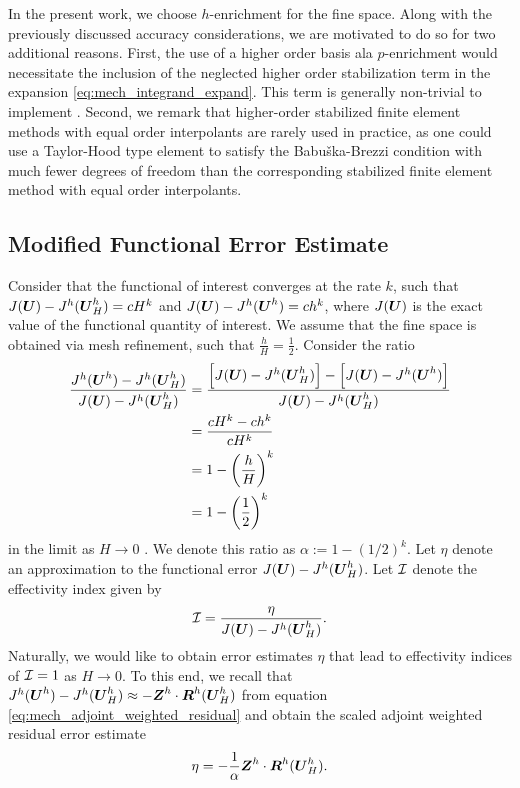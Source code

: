 In the present work, we choose $h$-enrichment for the fine space.
Along with the previously discussed accuracy considerations, we are motivated
to do so for two additional reasons. First, the use of a higher order basis
ala $p$-enrichment would necessitate the inclusion of the neglected higher
order stabilization term in the expansion \eqref{eq:mech_integrand_expand}.
This term is generally non-trivial to implement \cite{maniatty2002higher}.
Second, we remark that higher-order stabilized finite element methods with
equal order interpolants are rarely used in practice, as one could use a
Taylor-Hood type element \cite{taylor1973numerical} to satisfy the
Babu\v{s}ka-Brezzi condition with much fewer degrees of freedom than the
corresponding stabilized finite element method with equal order interpolants.

\subsection{Modified Functional Error Estimate}

Consider that the functional of interest converges at the rate $k$, such
that $J(\boldsymbol{U}) - J^h(\boldsymbol{U}^h_H) = cH^k$ and $J(\boldsymbol{U}) - J^h(\boldsymbol{U}^h) =
ch^k$, where $J(\boldsymbol{U})$ is the exact value of the functional quantity of
interest. We assume that the fine space is obtained via mesh refinement,
such that $\frac{h}{H} = \frac12$. Consider the ratio
%
\begin{gather}
\begin{aligned}
\frac{ J^h (\boldsymbol{U}^h) - J^h(\boldsymbol{U}^h_H) }{ J(\boldsymbol{U}) - J^h(\boldsymbol{U}^h_H) }
&= \frac{\left[ J(\boldsymbol{U}) - J^h(\boldsymbol{U}^h_H) \right] -
\left[ J(\boldsymbol{U}) - J^h(\boldsymbol{U}^h) \right] }
{ J(\boldsymbol{U}) - J^h(\boldsymbol{U}^h_H) } \\
&= \frac{c H^k - ch^k}{c H^k} \\
&= 1 - \left( \frac{h}{H} \right)^k \\
&= 1 - \left( \frac12 \right)^k
\end{aligned}
\end{gather}
%
in the limit as $H \to 0$ \cite{fidkowski2011review}. We denote this ratio
as $\alpha := 1 - (1/2)^k$. Let $\eta$ denote an approximation to the
functional error $J(\boldsymbol{U}) - J^h(\boldsymbol{U}^h_H)$. Let $\mathcal{I}$ denote the
effectivity index given by
%
\begin{gather}
\mathcal{I} = \frac{\eta}{ J(\boldsymbol{U}) - J^h(\boldsymbol{U}^h_H) }.
\label{eq:mech_effectivity}
\end{gather}
%
Naturally, we would like to obtain error estimates $\eta$ that lead to
effectivity indices of $\mathcal{I} = 1$ as $H \to 0$. To this end, we recall that
$J^h(\boldsymbol{U}^h) - J^h(\boldsymbol{U}^h_H) \approx - \boldsymbol{Z}^h \cdot
\boldsymbol{R}^h(\boldsymbol{U}^h_H)$ from equation \eqref{eq:mech_adjoint_weighted_residual}
and obtain the scaled adjoint weighted residual error estimate
%
\begin{gather}
\eta = - \frac{1}{\alpha} \boldsymbol{Z}^h \cdot \boldsymbol{R}^h(\boldsymbol{U}^h_H).
\label{eq:mech_error_estimate}
\end{gather}

